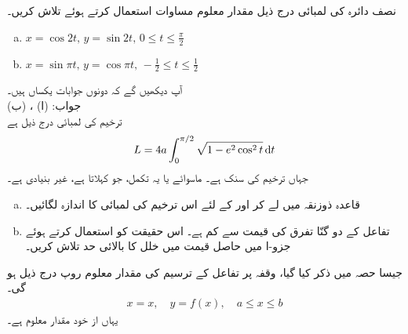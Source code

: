 \\
\\
نصف دائرہ  کی لمبائی درج ذیل مقدار معلوم مساوات استعمال کرتے ہوئے تلاش کریں۔
\begin{enumerate}[a.]
\item
$x=\cos 2t,\, y=\sin 2t,\, 0\le t\le \tfrac{\pi}{2}$
\item
$x=\sin \pi t,\, y=\cos \pi t,\, -\frac{1}{2}\le t\le \frac{1}{2}$
\end{enumerate}
آپ دیکھیں گے کہ دونوں جوابات یکساں ہیں۔\\
جواب:\quad
(ا) ، (ب) 
\\
ترخیم  کی لمبائی درج ذیل ہے
\begin{align*}
L=4a\int_0^{\pi/2}\sqrt{1-e^2\cos^2t}\dif t
\end{align*}
جہاں  ترخیم کی سنک ہے۔ ماسوائے  یا  یہ تکمل، جو  کہلاتا ہے، غیر بنیادی ہے۔ 
\begin{enumerate}[a.]
\item
قاعدہ ذوزنقہ میں  لے کر  اور  کے لئے  اس ترخیم کی لمبائی کا اندازہ لگائیں۔
\item
تفاعل  کے دو گنّا تفرق کی قیمت  سے کم ہے۔ اس حقیقت کو استعمال کرتے ہوئے جزو-ا میں حاصل قیمت میں خلل کا بالائی حد تلاش کریں۔
\end{enumerate}
جیسا حصہ  میں ذکر کیا گیا، وقفہ  پر تفاعل  کے ترسیم کی مقدار معلوم روپ درج ذیل ہو گی۔
\begin{align*}
x=x,\quad y=f(x),\quad a\le x\le b
\end{align*} 
یہاں  از خود مقدار معلوم ہے۔

